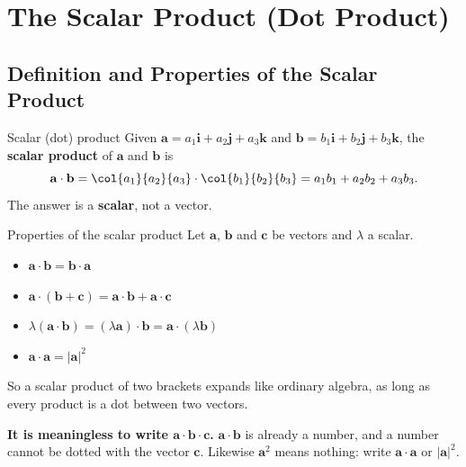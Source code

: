 \clearpage
\section{The Scalar Product (Dot Product)}
\subsection{Definition and Properties of the Scalar Product}
\begin{definition}{Scalar (dot) product}
Given $\mathbf{a} = a_1\mathbf{i} + a_2\mathbf{j} + a_3\mathbf{k}$ and $\mathbf{b} = b_1\mathbf{i} + b_2\mathbf{j} + b_3\mathbf{k}$, the \textbf{scalar product} of $\mathbf{a}$ and $\mathbf{b}$ is
\[
\mathbf{a}\cdot\mathbf{b} = \col{a_1}{a_2}{a_3}\cdot\col{b_1}{b_2}{b_3} = a_1 b_1 + a_2 b_2 + a_3 b_3 .
\]
The answer is a \textbf{scalar}, not a vector.
\end{definition}

\begin{definition}{Properties of the scalar product}
Let $\mathbf{a}$, $\mathbf{b}$ and $\mathbf{c}$ be vectors and $\lambda$ a scalar.
\begin{itemize}
  \item $\mathbf{a}\cdot\mathbf{b} = \mathbf{b}\cdot\mathbf{a}$
  \item $\mathbf{a}\cdot(\mathbf{b}+\mathbf{c}) = \mathbf{a}\cdot\mathbf{b} + \mathbf{a}\cdot\mathbf{c}$
  \item $\lambda(\mathbf{a}\cdot\mathbf{b}) = (\lambda\mathbf{a})\cdot\mathbf{b} = \mathbf{a}\cdot(\lambda\mathbf{b})$
  \item $\mathbf{a}\cdot\mathbf{a} = |\mathbf{a}|^{2}$
\end{itemize}
\end{definition}
So a scalar product of two brackets expands like ordinary algebra, as long as every product is a dot between two vectors.

\begin{caution}
\textbf{It is meaningless to write $\mathbf{a}\cdot\mathbf{b}\cdot\mathbf{c}$.} $\mathbf{a}\cdot\mathbf{b}$ is already a number, and a number cannot be dotted with the vector $\mathbf{c}$. Likewise $\mathbf{a}^{2}$ means nothing: write $\mathbf{a}\cdot\mathbf{a}$ or $|\mathbf{a}|^{2}$.
\end{caution}

